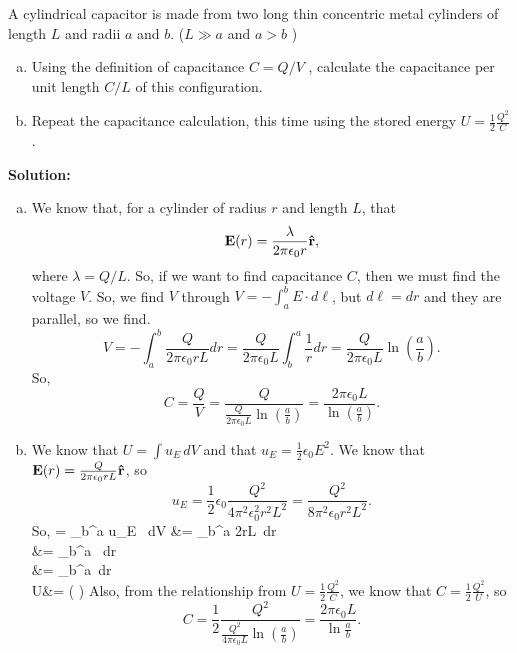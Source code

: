 \documentclass[11pt]{article}
\newcommand{\be}{\begin{enumerate}[a) ]}
\newcommand{\ee}{\end{enumerate}}
\def\bal#1\eal{\begin{align*}#1\end{align*}}
\newcommand{\pn}[1]{\left( #1 \right)}
\begin{document}
\clearpage

\begin{problem}[\P 6.]
A cylindrical capacitor is made from two long thin concentric metal cylinders of length $L$
and radii $a$ and $b$. ($L \gg a$ and $a >b$ )
\be
\item Using the definition of capacitance $C =Q/V$ ,	calculate the capacitance per unit
length $C /L$ of this configuration.
\item Repeat the capacitance calculation, this time using the stored energy $U = \frac{1}{2}\frac{Q^2}{C}$.
\ee
\end{problem}


\textbf{Solution:}\be
\item We know that, for a cylinder of radius $r$ and length $L$, that
\[
	\mathbf{E}(r) = \frac{\lambda}{2\pi\epsilon_0r}\mathbf{\hat{r}},
\]
where $\lambda=Q/L$. So, if we want to find capacitance $C$, then we must find the voltage $V$. So, we find $V$ through $V = -\int_a^b E\cdot d\ell$, but $d\ell = dr$ and they are parallel, so we find.
\[
	V = -\int_a^b \frac{Q}{2\pi\epsilon_0rL}dr=\frac{Q}{2\pi\epsilon_0L}\int_b^a\frac{1}{r}dr=\frac{Q}{2\pi\epsilon_0L}\ln\pn{\frac{a}{b}}.
\]
So,
\[
	C = \frac{Q}{V} = \frac{Q}{\frac{Q}{2\pi\epsilon_0L}\ln\pn{\frac{a}{b}}} =\boxed{ \frac{2\pi\epsilon_0L}{\ln\pn{\frac{a}{b}}}.}
\]
\item We know that $U = \int u_E \, dV$ and that $u_E = \frac{1}{2}\epsilon_0 E^2$. We know that $\mathbf{E}(r) = \frac{Q}{2\pi\epsilon_0rL}\mathbf{\hat{r}}$, so
\[
	u_E = \frac{1}{2}\epsilon_0\frac{Q^2}{4\pi^2\epsilon_0^2r^2L^2} = \frac{Q^2}{8\pi^2\epsilon_0r^2L^2}.
\]
So, 
\bal
	U = \int_b^a u_E \, dV &= \int_b^a  2\pi rL\, dr\\
	&= \int_b^a  \, dr\\
	&= \int_b^a \,dr\\
	U&=  \ln\pn{}
\eal
Also, from the relationship from $U = \frac{1}{2}\frac{Q^2}{C}$, we know that $C = \frac{1}{2}\frac{Q^2}{U}$, so
\[
	C = \frac{1}{2}\frac{Q^2}{\frac{Q^2}{4\pi\epsilon_0L} \ln\pn{\frac{a}{b}}} =\boxed{ \frac{2\pi\epsilon_0L}{\ln{\frac{a}{b}}} .}
\]
\ee


\clearpage
\end{document}
